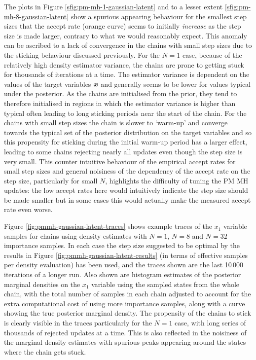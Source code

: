 The plots in Figure \ref{sfig:pm-mh-1-gaussian-latent} and to a lesser extent \ref{sfig:pm-mh-8-gaussian-latent} show a spurious appearing behaviour for the smallest step sizes that the accept rate (orange curve) seems to initially \emph{increase} as the step size is made larger, contrary to what we would reasonably expect. This anomaly can be ascribed to a lack of convergence in the chains with small step sizes due to the sticking behaviour discussed previously. For the $N=1$ case, because of the relatively high density estimator variance, the chains are prone to getting stuck for thousands of iterations at a time. The estimator variance is dependent on the values of the target variables $\boldsymbol{x}$ and generally seems to be lower for values typical under the posterior. As the chains are initialised from the prior, they tend to therefore initialised in regions in which the estimator variance is higher than typical often leading to long sticking periods near the start of the chain. For the chains with small step sizes the chain is slower to `warm-up' and converge towards the typical set of the posterior distribution on the target variables and so this propensity for sticking during the initial warm-up period has a larger effect, leading to some chains rejecting nearly all updates even though the step size is very small. This counter intuitive behaviour of the empirical accept rates for small step sizes and general noisiness of the dependency of the accept rate on the step size, particularly for small $N$, highlights the difficulty of tuning the \ac{PM} \ac{MH} updates: the low accept rates here would intuitively indicate the step size should be made smaller but in some cases this would actually make the measured accept rate even worse.

Figure \ref{fig:pmmh-gaussian-latent-traces} shows example traces of the $x_1$ variable samples for chains using density estimates with $N=1$, $N=8$ and $N=32$ importance samples. In each case the step size suggested to be optimal by the results in Figure \ref{fig:pmmh-gaussian-latent-results} (in terms of effective samples per density evaluation) has been used, and the traces shown are the last 10\,000 iterations of a longer run. Also shown are histogram estimates of the posterior marginal densities on the $x_1$ variable using the sampled states from the whole chain, with the total number of samples in each chain adjusted to account for the extra computational cost of using more importance samples, along with a curve showing the true posterior marginal density. The propensity of the chains to stick is clearly visible in the traces particularly for the $N=1$ case, with long series of thousands of rejected updates at a time. This is also reflected in the noisiness of the marginal density estimates with spurious peaks appearing around the states where the chain gets stuck.

